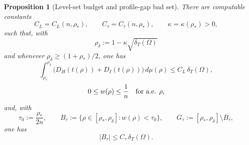 \documentclass[11pt]{amsart}
\newtheorem{proposition}[theorem]{Proposition}
\theoremstyle{definition}
\newcommand{\Om}{\Omega}
\newcommand{\dT}{\delta_T}
\newcommand{\rstar}{\rho_*}
\newcommand{\rdel}{\rho_\delta}
\newcommand{\wt}{w}
\begin{document}
\begin{proposition}[Level-set budget and profile-gap bad set]
\label{prop:levelset}
There are computable constants
\[
   C_L=C_L(n,\rstar),\qquad C_\tau=C_\tau(n,\rstar),
   \qquad \kappa=\kappa(\rstar)>0,
\]
such that, with
\[
   \rdel:=1-\kappa\sqrt{\dT(\Om)}
\]
and whenever \(\rdel\ge(1+\rstar)/2\), one has
\begin{equation}\label{eq:budget}
   \int_{\rstar}^{\rdel}
      \bigl(D_H(t(\rho))+D_I(t(\rho))\bigr)\,d\mu(\rho)
   \le C_L\,\dT(\Om),
\end{equation}
\[
   0\le \wt(\rho)\le\frac1n\quad\hbox{for a.e. }\rho,
\]
and, with
\[
   \tau_0:=\frac{\rstar}{2n},\qquad
   B_\tau:=\{\rho\in[\rstar,\rdel]:\wt(\rho)<\tau_0\},\qquad
   G_\tau:=[\rstar,\rdel]\setminus B_\tau,
\]
one has
\begin{equation}\label{eq:badtau}
   |B_\tau|\le C_\tau\,\dT(\Om).
\end{equation}
\end{proposition}
\end{document}
